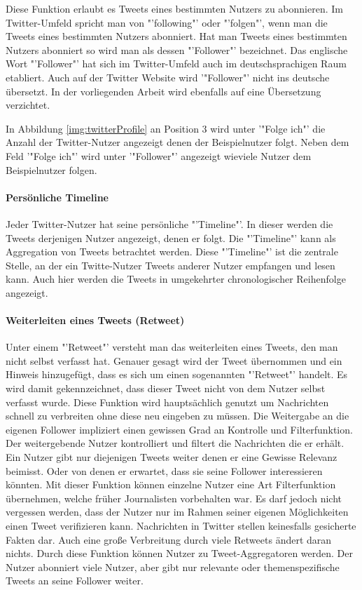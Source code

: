 				Diese Funktion erlaubt es Tweets eines bestimmten Nutzers zu abonnieren. 
				Im Twitter-Umfeld spricht man von "'following"' oder "'folgen"', wenn man die Tweets eines bestimmten Nutzers abonniert.
				Hat man Tweets eines bestimmten Nutzers abonniert so wird man als dessen "'Follower"' bezeichnet. 
				Das englische Wort "'Follower"' hat sich im Twitter-Umfeld auch im deutschsprachigen Raum etabliert. 
				Auch auf der Twitter Website wird '"Follower"' nicht ins deutsche übersetzt.
				In der vorliegenden Arbeit wird ebenfalls auf eine Übersetzung verzichtet. 

				In Abbildung \ref{img:twitterProfile} an Position 3 wird unter '"Folge ich"' die Anzahl der Twitter-Nutzer angezeigt denen der Beispielnutzer folgt. 
				Neben dem Feld '"Folge ich"' wird unter '"Follower"' angezeigt wieviele Nutzer dem Beispielnutzer folgen.

			\paragraph{Persönliche Timeline}
				Jeder Twitter-Nutzer hat seine persönliche "'Timeline"'.
				In dieser werden die Tweets derjenigen Nutzer angezeigt, denen er folgt. 
				Die "'Timeline"' kann als Aggregation von Tweets betrachtet werden.
				Diese "'Timeline"' ist die zentrale Stelle, an der ein Twitte-Nutzer Tweets anderer Nutzer empfangen und lesen kann.
				Auch hier werden die Tweets in umgekehrter chronologischer Reihenfolge angezeigt.  

			\paragraph{Weiterleiten eines Tweets (Retweet)}

				Unter einem "'Retweet"' versteht man das weiterleiten eines Tweets, den man nicht selbst verfasst hat.
				Genauer gesagt wird der Tweet übernommen und ein Hinweis hinzugefügt, dass es sich um einen sogenannten "'Retweet"' handelt.
				Es wird damit gekennzeichnet, dass dieser Tweet nicht von dem Nutzer selbst verfasst wurde.
				Diese Funktion wird hauptsächlich genutzt um Nachrichten schnell zu verbreiten ohne diese neu eingeben zu müssen. 
				Die Weitergabe an die eigenen Follower impliziert einen gewissen Grad an Kontrolle und Filterfunktion. 
				Der weitergebende Nutzer kontrolliert und filtert die Nachrichten die er erhält.
				Ein Nutzer gibt nur diejenigen Tweets weiter denen er eine Gewisse Relevanz beimisst.
				Oder von denen er erwartet, dass sie seine Follower interessieren könnten. 
				Mit dieser Funktion können einzelne Nutzer eine Art Filterfunktion übernehmen, welche früher Journalisten vorbehalten war. 
				Es darf jedoch nicht vergessen werden, dass der Nutzer nur im Rahmen seiner eigenen Möglichkeiten einen Tweet verifizieren kann.
				Nachrichten in Twitter stellen keinesfalls gesicherte Fakten dar.
				Auch eine große Verbreitung durch viele Retweets ändert daran nichts.
				Durch diese Funktion können Nutzer zu Tweet-Aggregatoren werden.
				Der Nutzer abonniert viele Nutzer, aber gibt nur relevante oder themenspezifische Tweets an seine Follower weiter. 

